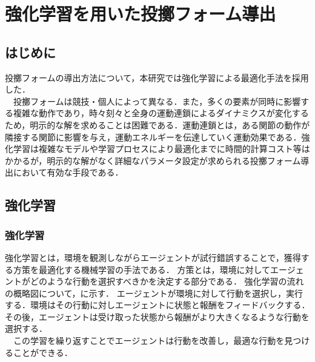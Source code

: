 \chapter[強化学習を用いた投擲フォーム導出]{強化学習を用いた投擲フォーム導出}

\section{はじめに}
投擲フォームの導出方法について，本研究では強化学習による最適化手法を採用した．\\
　投擲フォームは競技・個人によって異なる．また，多くの要素が同時に影響する複雑な動作であり，時々刻々と全身の運動連鎖\cite{iwasako}\cite{burkhart}によるダイナミクスが変化するため，明示的な解を求めることは困難である．運動連鎖とは，ある関節の動作が隣接する関節に影響を与え，運動エネルギーを伝達していく運動効果である．強化学習は複雑なモデルや学習プロセスにより最適化までに時間的計算コスト等はかかるが，明示的な解がなく詳細なパラメータ設定が求められる投擲フォーム導出において有効な手段である．

\section{強化学習}
\subsection{強化学習}
強化学習\cite{rl1}\cite{rl2}とは，環境を観測しながらエージェントが試行錯誤することで，獲得する方策を最適化する機械学習の手法である．
方策とは，環境に対してエージェントがどのような行動を選択すべきかを決定する部分である．
強化学習の流れの概略図について，に示す．
エージェントが環境に対して行動を選択し，実行する．環境はその行動に対しエージェントに状態と報酬をフィードバックする．
その後，エージェントは受け取った状態から報酬がより大きくなるような行動を選択する．\\
　この学習を繰り返すことでエージェントは行動を改善し，最適な行動を見つけることができる．
